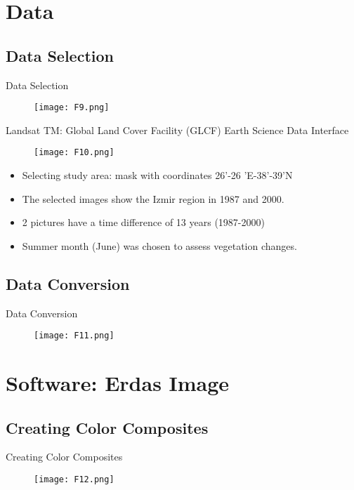 \documentclass[pdflatex,compress,9pt,
	xcolor={dvipsnames,dvipsnames,svgnames,x11names,table},
	hyperref={colorlinks = true,breaklinks = true, urlcolor = NavyBlue, breaklinks = true}]{beamer}
\begin{document}
\section{Data}
\subsection{Data Selection}
\begin{frame}{Data Selection}
\begin{figure}[H]
	\centering
		\texttt{[image: F9.png]}
\end{figure}
Landsat TM: Global Land Cover Facility (GLCF) Earth Science Data Interface
\begin{figure}[H]
	\centering
		\texttt{[image: F10.png]}
\end{figure}
\begin{itemize}
            \item Selecting study area: mask with coordinates 26’-26 'E-38’-39'N
            \item The selected images show the Izmir region in 1987 and 2000.
            \item 2 pictures have a time difference of 13 years (1987-2000)
            \item Summer month (June) was chosen to assess vegetation changes.
\end{itemize}
\end{frame}

\subsection{Data Conversion}
\begin{frame}{Data Conversion}
\begin{figure}[H]
	\centering
		\texttt{[image: F11.png]}
\end{figure}
\end{frame}

\section{Software: Erdas Image}
\subsection{Creating Color Composites}
\begin{frame}{Creating Color Composites}
\begin{figure}[H]
	\centering
		\texttt{[image: F12.png]}
\end{figure}
\end{frame}
\end{document}
